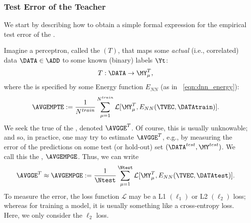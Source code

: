 

\subsubsection{Test Error of the Teacher}

We start by describing how to obtain a simple formal expression for the empirical test error of the \Teacher \Perceptron.

Imagine a perceptron, called the \Teacher $(T)$, 
that maps some \emph{actual} (i.e., correlated) data
$\DATA\in\ADD$ to some known (binary) labels $\Yt$:
\begin{align}
 T:\DATA\rightarrow \MY^{T}_{\mu} ,
\end{align}
where the \Teacher \Perceptron is specified by some Energy function $E_{NN}$ (as in \EQN~\ref{eqn:dnn_energy}):
\begin{align}
\label{eqn:Eg_train}
\AVGEMPTE:= \frac{1}{N^{train}}\sum_{\mu=1}^{N^{train}}\mathcal{L}[\MY^{T}_{\mu},E_{NN}(\TVEC,\DATAtrain)]  .
\end{align}
We seek the true \GeneralizationError of the \Teacher, denoted  $\AVGGE^{T}$. 
Of course, this is usually unknowable; and so, in practice, one may try to estimate $\AVGGE^{T}$, e.g.,
by measuring the error of the \Teacher predictions on some test (or hold-out) set $(\DATA^{test}, \MY^{test})$.
We call this the \emph{\AverageGeneralizationError}, $\AVGEMPGE$.
Thus, we can write
\begin{align}
\label{eqn:Eg_test}
 \AVGGE^{T}\approx \AVGEMPGE:= \frac{1}{\Ntest}\sum_{\mu=1}^{\Ntest}\mathcal{L}[\MY^{T}_{\mu},E_{NN}(\TVEC,\DATAtest)] .
\end{align}
To measure the error, the loss function $\mathcal{L}$ may be a L1 $(\ell_1)$ or L2 $(\ell_2)$ loss;
whereas for training a model, it is usually something like a cross-entropy loss.
Here, we only consider the $\ell_2$ loss.



